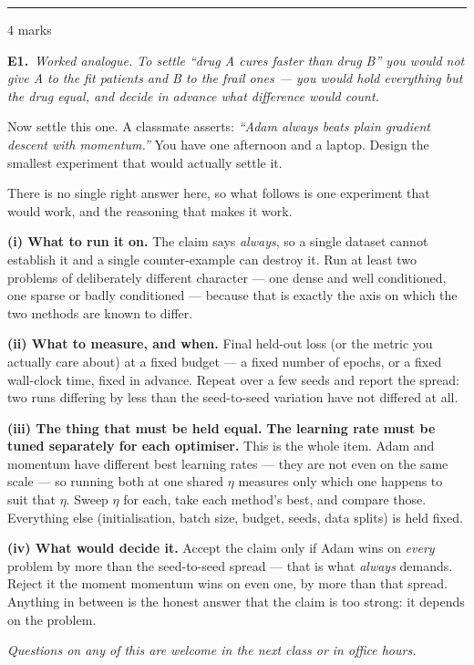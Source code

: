 \documentclass[10pt,a4paper]{article}
\newcommand{\parthead}[2]{\vspace{2pt}\noindent\rule{\linewidth}{0.4pt}\par\vspace{2pt}%
  \noindent{\bfseries Part #1}\hfill{\small #2}\par\vspace{1pt}}
\begin{document}
\newpage

\parthead{E --- Reasoning}{4 marks}

\textbf{E1.}\ \emph{Worked analogue. To settle ``drug A cures faster than drug B'' you would not give A to the fit
patients and B to the frail ones --- you would hold everything but the drug equal, and decide in advance what
difference would count.}

\vspace{2mm}
Now settle this one. A classmate asserts: \emph{``Adam always beats plain gradient descent with momentum.''}
You have one afternoon and a laptop. Design the smallest experiment that would actually settle it.

\vspace{4pt}

There is no single right answer here, so what follows is one experiment that would work, and the reasoning that makes it work.\par\vspace{1mm}\textbf{(i) What to run it on.} The claim says \emph{always}, so a single dataset cannot establish it and a single counter-example can destroy it. Run at least two problems of deliberately different character --- one dense and well conditioned, one sparse or badly conditioned --- because that is exactly the axis on which the two methods are known to differ.\par\vspace{1mm}\textbf{(ii) What to measure, and when.} Final held-out loss (or the metric you actually care about) at a fixed budget --- a fixed number of epochs, or a fixed wall-clock time, fixed in advance. Repeat over a few seeds and report the spread: two runs differing by less than the seed-to-seed variation have not differed at all.\par\vspace{1mm}\textbf{(iii) The thing that must be held equal.} \textbf{The learning rate must be tuned separately for each optimiser.} This is the whole item. Adam and momentum have different best learning rates --- they are not even on the same scale --- so running both at one shared $\eta$ measures only which one happens to suit that $\eta$. Sweep $\eta$ for each, take each method's best, and compare those. Everything else (initialisation, batch size, budget, seeds, data splits) is held fixed.\par\vspace{1mm}\textbf{(iv) What would decide it.} Accept the claim only if Adam wins on \emph{every} problem by more than the seed-to-seed spread --- that is what \emph{always} demands. Reject it the moment momentum wins on even one, by more than that spread. Anything in between is the honest answer that the claim is too strong: it depends on the problem.

\vfill

{\footnotesize\itshape Questions on any of this are welcome in the next class or in office hours.}

\newpage
\end{document}

